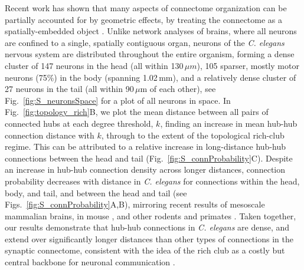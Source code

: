 \documentclass[10pt,letterpaper]{article}
\begin{document}
Recent work has shown that many aspects of connectome organization can be partially accounted for by geometric effects, by treating the connectome as a spatially-embedded object \cite{Henderson:2014fg, Roberts2016, Horvat:2016ia}.
Unlike network analyses of brains, where all neurons are confined to a single, spatially contiguous organ, neurons of the \emph{C. elegans} nervous system are distributed throughout the entire organism, forming a dense cluster of 147 neurons in the head (all within 130\,$\mu m$), 105 sparser, mostly motor neurons (75\%) in the body (spanning 1.02\,mm), and a relatively dense cluster of 27 neurons in the tail (all within 90\,$\mu$m of each other), see Fig.~\ref{fig:S_neuronsSpace} for a plot of all neurons in space.
In Fig.~\ref{fig:topology_rich}B, we plot the mean distance between all pairs of connected hubs at each degree threshold, $k$, finding an increase in mean hub-hub connection distance with $k$, through to the extent of the topological rich-club regime.
This can be attributed to a relative increase in long-distance hub-hub connections between the head and tail (Fig.~\ref{fig:S_connProbability}C).
Despite an increase in hub-hub connection density across longer distances, connection probability decreases with distance in \emph{C. elegans} for connections within the head, body, and tail, and between the head and tail (see Figs.~\ref{fig:S_connProbability}A,B), mirroring recent results of mesoscale mammalian brains, in mouse \cite{Goulas:2016hr, Fulcher:2016ck}, and other rodents and primates \cite{Horvat:2016ia}.
Taken together, our results demonstrate that hub-hub connections in \emph{C. elegans} are dense, and extend over significantly longer distances than other types of connections in the synaptic connectome, consistent with the idea of the rich club as a costly but central backbone for neuronal communication \cite{vandenHeuvel:2012kh}.

\end{document}
